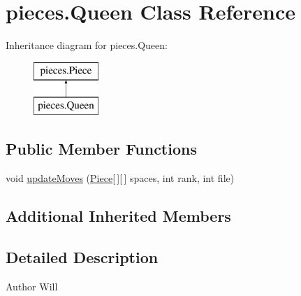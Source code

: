 \hypertarget{classpieces_1_1_queen}{\section{pieces.\-Queen Class Reference}
\label{classpieces_1_1_queen}
}
Inheritance diagram for pieces.\-Queen\-:\begin{figure}[H]
\begin{center}
\leavevmode
\includegraphics[height=2.000000cm]{classpieces_1_1_queen}
\end{center}
\end{figure}
\subsection*{Public Member Functions}
\begin{DoxyCompactItemize}
\item 
void \hyperlink{classpieces_1_1_queen_ab46d0c19a46b51e8d6aedddd0ef58aa7}{update\-Moves} (\hyperlink{classpieces_1_1_piece}{Piece}\mbox{[}$\,$\mbox{]}\mbox{[}$\,$\mbox{]} spaces, int rank, int file)
\end{DoxyCompactItemize}
\subsection*{Additional Inherited Members}


\subsection{Detailed Description}
\begin{DoxyAuthor}{Author}
Will 
\end{DoxyAuthor}


